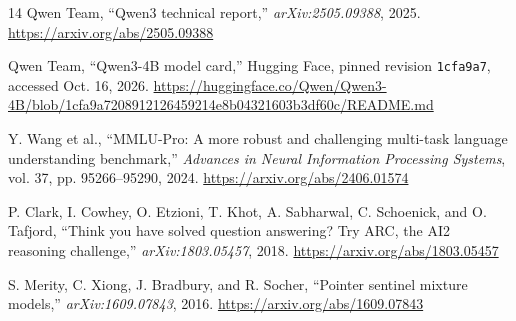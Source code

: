 \documentclass[conference]{IEEEtran}
\begin{document}
\begin{thebibliography}{14}
Qwen Team, ``Qwen3 technical report,'' \emph{arXiv:2505.09388}, 2025.
\url{https://arxiv.org/abs/2505.09388}

Qwen Team, ``Qwen3-4B model card,'' Hugging Face, pinned revision
\texttt{1cfa9a7}, accessed Oct. 16, 2026.
\url{https://huggingface.co/Qwen/Qwen3-4B/blob/1cfa9a7208912126459214e8b04321603b3df60c/README.md}

Y. Wang et al., ``MMLU-Pro: A more robust and challenging multi-task
language understanding benchmark,'' \emph{Advances in Neural Information
Processing Systems}, vol. 37, pp. 95266--95290, 2024.
\url{https://arxiv.org/abs/2406.01574}

P. Clark, I. Cowhey, O. Etzioni, T. Khot, A. Sabharwal,
C. Schoenick, and O. Tafjord,
``Think you have solved question answering? Try ARC, the AI2 reasoning challenge,''
\emph{arXiv:1803.05457}, 2018.
\url{https://arxiv.org/abs/1803.05457}

S. Merity, C. Xiong, J. Bradbury, and R. Socher,
``Pointer sentinel mixture models,'' \emph{arXiv:1609.07843}, 2016.
\url{https://arxiv.org/abs/1609.07843}
\end{thebibliography}
\end{document}
